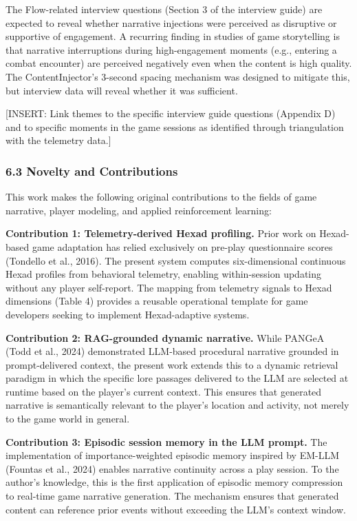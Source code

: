The Flow-related interview questions (Section 3 of the interview guide)
are expected to reveal whether narrative injections were perceived as
disruptive or supportive of engagement. A recurring finding in studies
of game storytelling is that narrative interruptions during
high-engagement moments (e.g., entering a combat encounter) are
perceived negatively even when the content is high quality. The
ContentInjector's 3-second spacing mechanism was designed to mitigate
this, but interview data will reveal whether it was sufficient.

{[}INSERT: Link themes to the specific interview guide questions
(Appendix D) and to specific moments in the game sessions as identified
through triangulation with the telemetry data.{]}

\subsubsection{6.3 Novelty and
Contributions}\label{novelty-and-contributions}

This work makes the following original contributions to the fields of
game narrative, player modeling, and applied reinforcement learning:

\textbf{Contribution 1: Telemetry-derived Hexad profiling.} Prior work
on Hexad-based game adaptation has relied exclusively on pre-play
questionnaire scores (Tondello et al., 2016). The present system
computes six-dimensional continuous Hexad profiles from behavioral
telemetry, enabling within-session updating without any player
self-report. The mapping from telemetry signals to Hexad dimensions
(Table 4) provides a reusable operational template for game developers
seeking to implement Hexad-adaptive systems.

\textbf{Contribution 2: RAG-grounded dynamic narrative.} While PANGeA
(Todd et al., 2024) demonstrated LLM-based procedural narrative grounded
in prompt-delivered context, the present work extends this to a dynamic
retrieval paradigm in which the specific lore passages delivered to the
LLM are selected at runtime based on the player's current context. This
ensures that generated narrative is semantically relevant to the
player's location and activity, not merely to the game world in general.

\textbf{Contribution 3: Episodic session memory in the LLM prompt.} The
implementation of importance-weighted episodic memory inspired by EM-LLM
(Fountas et al., 2024) enables narrative continuity across a play
session. To the author's knowledge, this is the first application of
episodic memory compression to real-time game narrative generation. The
mechanism ensures that generated content can reference prior events
without exceeding the LLM's context window.

